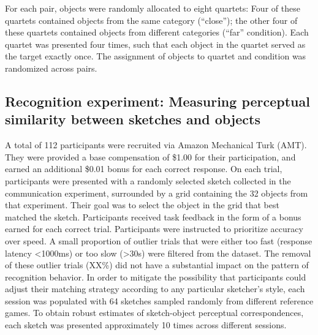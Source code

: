 \documentclass[9pt,twocolumn,twoside]{pnas-new}
\begin{document}
{For each pair, objects were randomly allocated to eight quartets: Four of these quartets contained objects from the same category (``close''); the other four of these quartets contained objects from different categories (``far'' condition). 
Each quartet was presented four times, such that each object in the quartet served as the target exactly once. The assignment of objects to quartet and condition was randomized across pairs.


\subsection*{Recognition experiment: Measuring perceptual similarity between sketches and objects}


A total of 112 participants were recruited via Amazon Mechanical Turk (AMT). They were provided a base compensation of \$1.00 for their participation, and earned an additional \$0.01 bonus for each correct response.
On each trial, participants were presented with a randomly selected sketch collected in the communication experiment, surrounded by a grid containing the 32 objects from that experiment. Their goal was to select the object in the grid that best matched the sketch. 
Participants received task feedback in the form of a bonus earned for each correct trial. 
Participants were instructed to prioritize accuracy over speed. 
A small proportion of outlier trials that were either too fast (response latency <1000ms) or too slow (>30s) were filtered from the dataset. 
The removal of these outlier trials (XX\%) did not have a substantial impact on the pattern of recognition behavior. 
In order to mitigate the possibility that participants could adjust their matching strategy according to any particular sketcher's style, each session was populated with 64 sketches sampled randomly from different reference games. 
To obtain robust estimates of sketch-object perceptual correspondences, each sketch was presented approximately 10 times across different sessions.  

}
\end{document}
